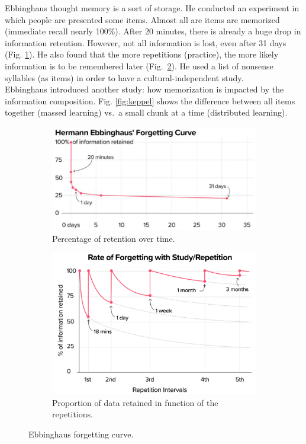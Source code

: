 Ebbinghaus thought memory is a sort of storage.
He conducted an experiment in which people are presented some items. Almost all are items are memorized (immediate recall nearly 100\%). After 20 minutes, there is already a huge drop in information retention. However, not all information is lost, even after 31 days (Fig. \ref{fig:ebbinghaus}). He also found that the more repetitions (practice), the more likely 
information is to be remembered later (Fig.~\ref{fig:ebbinghaus_2}).
He used a list of nonsense syllables (as items) in order to have a cultural-independent study.\\
Ebbinghaus introduced another study: how memorization is impacted by the information composition.
Fig. \ref{fig:keppel} shows the difference between all items together (massed learning) vs.~a small chunk at a time (distributed learning).

\begin{figure}[!ht]
    \centering
    \captionsetup{width=.8\linewidth}
    \begin{subfigure}{.49\textwidth}
        \centering
        \captionsetup{width=.8\linewidth}
        \includegraphics[width=.9\linewidth]{images/ebbinghaus.png}
        \caption{Percentage of retention over time.}
        \label{fig:ebbinghaus}
    \end{subfigure}
    \begin{subfigure}{.49\textwidth}
        \centering
        \captionsetup{width=.8\linewidth}
        \includegraphics[width=.85\linewidth]{images/ebbinghaus_2.png}
        \caption{Proportion of data retained in function of the repetitions.}
        \label{fig:ebbinghaus_2}
    \end{subfigure}
    \caption{Ebbinghaus forgetting curve.}
    \label{fig:ebbinghaus_1}
\end{figure}

